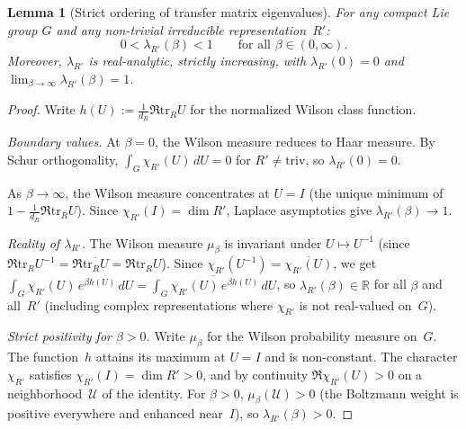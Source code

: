 \documentclass[11pt]{article}
\newtheorem{lemma}[theorem]{Lemma}
\theoremstyle{definition}
\newcommand{\tr}{\mathrm{tr}}
\newcommand{\R}{\mathbb{R}}
\begin{document}
\begin{lemma}[Strict ordering of transfer matrix
eigenvalues]\label{sun-lem:alpha}
For any compact Lie group $G$ and any non-trivial
irreducible representation~$R'$:
\begin{equation}
0<\lambda_{R'}(\beta)<1\qquad
\text{for all }\beta\in(0,\infty).
\end{equation}
Moreover, $\lambda_{R'}$ is real-analytic, strictly
increasing, with $\lambda_{R'}(0)=0$ and
$\lim_{\beta\to\infty}\lambda_{R'}(\beta)=1$.
\end{lemma}

\begin{proof}
Write $h(U):=\frac{1}{d_R}\Re\tr_R U$ for the
normalized Wilson class function.

\emph{Boundary values.}
At $\beta=0$, the Wilson measure reduces to Haar
measure.  By Schur orthogonality,
$\int_G\chi_{R'}(U)\,dU=0$ for $R'\ne\text{triv}$,
so $\lambda_{R'}(0)=0$.

As $\beta\to\infty$, the Wilson measure concentrates
at $U=I$ (the unique minimum of $1-\frac{1}{d_R}\Re\tr_R U$).
Since $\chi_{R'}(I)=\dim R'$, Laplace asymptotics give
$\lambda_{R'}(\beta)\to 1$.

\emph{Reality of $\lambda_{R'}$.}
The Wilson measure $\mu_\beta$ is invariant under
$U\mapsto U^{-1}$ (since
$\Re\tr_R U^{-1}=\Re\overline{\tr_R U}=\Re\tr_R U$).
Since $\chi_{R'}(U^{-1})=\overline{\chi_{R'}(U)}$,
we get $\int_G\chi_{R'}(U)\,e^{\beta h(U)}\,dU
=\overline{\int_G\chi_{R'}(U)\,e^{\beta h(U)}\,dU}$,
so $\lambda_{R'}(\beta)\in\R$ for all $\beta$ and
all~$R'$ (including complex representations where
$\chi_{R'}$ is not real-valued on~$G$).

\emph{Strict positivity for $\beta>0$.}
Write $\mu_\beta$ for the Wilson probability measure
on~$G$.  The function~$h$
attains its maximum at $U=I$ and is non-constant.
The character $\chi_{R'}$ satisfies
$\chi_{R'}(I)=\dim R'>0$, and by continuity
$\Re\chi_{R'}(U)>0$ on a neighborhood~$\mathcal{U}$
of the identity.  For $\beta>0$, $\mu_\beta(\mathcal{U})>0$
(the Boltzmann weight is positive everywhere and
enhanced near~$I$), so $\lambda_{R'}(\beta)>0$.


\end{proof}
\end{document}
